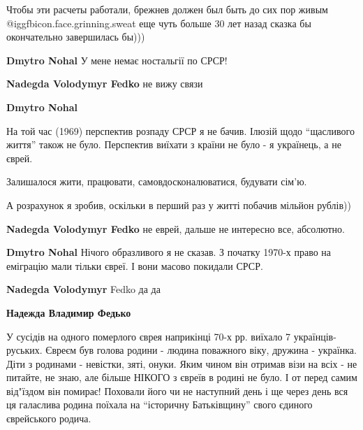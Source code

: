  
 
 
 
 
\zzSecCmt

\begin{itemize} %

Чтобы эти расчеты работали, брежнев должен был быть до сих пор живым @igg{fbicon.face.grinning.sweat}  еще чуть
больше 30 лет назад сказка бы окончательно завершилась бы)))

\begin{itemize} %
\textbf{Dmytro Nohal} У мене немає ностальгії по СРСР!

\begin{itemize} %
\textbf{Nadegda Volodymyr Fedko} не вижу связи

\textbf{Dmytro Nohal} 

На той час (1969) перспектив розпаду СРСР я не бачив. Ілюзій щодо
\enquote{щасливого життя} також не було. Перспектив виїхати з країни не було -
я українець, а не єврей.

Залишалося жити, працювати, самовдосконалюватися, будувати сім'ю.

А розрахунок я зробив, оскільки в перший раз у житті побачив мільйон рублів))

\textbf{Nadegda Volodymyr Fedko} не еврей, дальше не интересно все, абсолютно.

\textbf{Dmytro Nohal} Нічого образливого я не сказав. З початку 1970-х право на еміграцію мали тільки євреї. І вони масово покидали СРСР.

\textbf{Nadegda Volodymyr} Fedko да да

\textbf{Надежда Владимир Федько} 

У сусідів на одного померлого єврея наприкінці 70-х рр. виїхало 7
українців-руських. Євреєм був голова родини - людина поважного віку, дружина -
українка. Діти з родинами - невістки, зяті, онуки. Яким чином він отримав візи
на всіх - не питайте, не знаю, але більше НІКОГО з євреїв в родині не було. І
от перед самим від"їздом він помирає! Поховали його чи не наступний день і ще
через день вся ця галаслива родина поїхала на \enquote{історичну Батьківщину} свого
єдиного єврейського родича.



\end{itemize}
\end{itemize}
\end{itemize}
